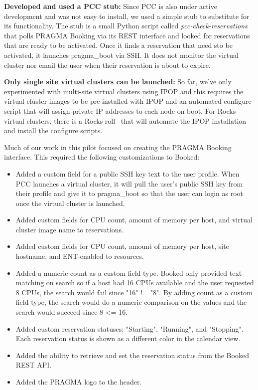 \documentclass{acm_proc_article-sp}
\begin{document}
\textbf{Developed and used a PCC stub:}  Since PCC is also under active development and was not easy to install, we used a simple stub to substitute for its functionality.  The stub is a small Python script called \textit{pcc-check-reservations} that polls PRAGMA Booking via its REST interface and looked for reservations that are ready to be activated.  Once it finds a reservation that need sto be activated, it launches pragma\_boot via SSH.  It does not  monitor the virtual cluster nor email the user when their reservation is about to expire.  

\textbf{Only single site virtual clusters can be launched:}  So far, we've only experimented with multi-site virtual clusters using IPOP and this requires the virtual cluster images to be pre-installed with IPOP and an automated configure script that will assign private IP addresses to each node on boot.  For Rocks virtual clusters, there is a Rocks roll~\cite{ipoproll} that will automate the IPOP installation and install the configure scripts.  

Much of our work in this pilot focused on creating the PRAGMA Booking interface.  This required the following customizations to Booked:

\begin{itemize}
\item Added a custom field for a public SSH key text  to the user profile.  When PCC launches a virtual cluster, it will pull the user's public SSH key from their profile and give it to pragma\_boot so that the user can login as root once the virtual cluster is launched.   
\item Added custom fields for CPU count, amount of memory per host, and virtual cluster image name to reservations.
\item Added custom fields for CPU count, amount of memory per host, site hostname, and ENT-enabled to resources.
\item Added a numeric count as a custom field type.  Booked only provided text matching on search so if a host had 16 CPUs available and the user requested 8 CPUs, the search would fail since "16" != "8".  By adding count as a custom field type, the search would do a numeric comparison on the values and the search would succeed since 8 <= 16.
\item Added custom reservation statuses: "Starting", "Running", and "Stopping".  Each reservation status is shown as a different color in  the calendar view.
\item Added the ability to retrieve and set the reservation status from the Booked REST API.  	
\item Added the PRAGMA logo to the header.
\end{itemize}
\end{document}
